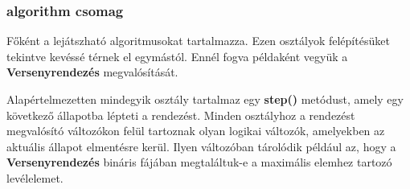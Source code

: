 \documentclass{elteikthesis}
\begin{document}
\subsubsection{algorithm csomag}
Főként a lejátszható algoritmusokat tartalmazza. Ezen osztályok felépítésüket tekintve kevéssé térnek el egymástól. Ennél fogva példaként vegyük a \textbf{Versenyrendezés} megvalósítását.

\par Alapértelmezetten mindegyik osztály tartalmaz egy \textbf{step()} metódust, amely egy következő állapotba lépteti a rendezést. Minden osztályhoz a rendezést megvalósító változókon felül tartoznak olyan logikai változók, amelyekben az aktuális állapot elmentésre kerül. Ilyen változóban tárolódik például az, hogy a \textbf{Versenyrendezés} bináris fájában megtaláltuk-e a maximális elemhez tartozó levélelemet.
\end{document}
